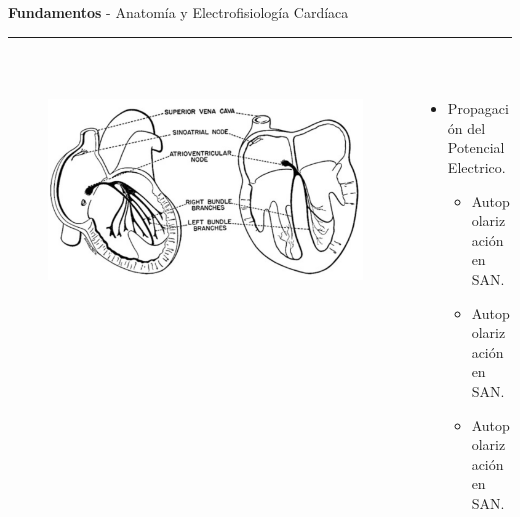 \documentclass[11pt]{beamer}
\begin{document}
	\begin{frame}[t]
		\vspace*{0.5 cm} \textbf{Fundamentos} - Anatomía y Electrofisiología Cardíaca \\
		\color{brown}\rule{\linewidth}{4pt} \\ [0.5 cm]
		\begin{columns}[T] %
			\begin{column}{.48\textwidth}
				\begin{figure}[H]
					\centering			
					\includegraphics[height= 3.5 cm]{fig/fundamentals-sistema_de_conduccion}
				\end{figure}
				
			\end{column}%
			\hfill%
			\begin{column}{.48\textwidth}
				\begin{itemize}
					\item Propagación del Potencial Electrico.
					\begin{itemize}
						\item Autopolarización en SAN.
						\item Autopolarización en SAN.
						\item Autopolarización en SAN.												
					\end{itemize}
				\end{itemize}
			\end{column}%
		\end{columns}
	\end{frame}
\end{document}
